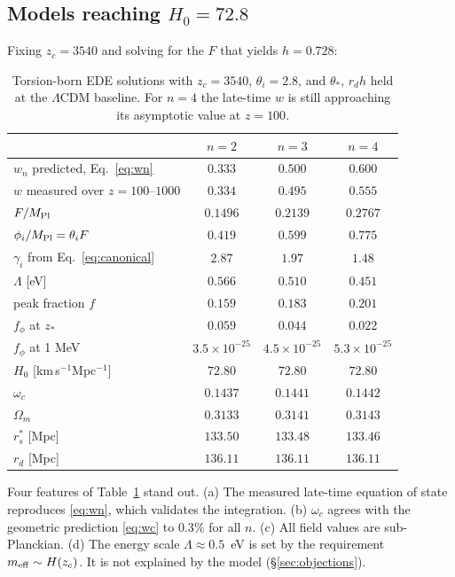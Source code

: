\documentclass[11pt]{article}
\newcommand{\Mp}{M_{\rm Pl}}
\begin{document}
\subsection{Models reaching $H_0=72.8$}
Fixing $z_c=3540$ and solving for the $F$ that yields $h=0.728$:
\begin{table}[h]
\centering
\begin{tabular}{lccc}
\toprule
& $n=2$ & $n=3$ & $n=4$\\
\midrule
$w_n$ predicted, Eq.~\eqref{eq:wn} & $0.333$ & $0.500$ & $0.600$\\
$w$ measured over $z=100$--$1000$ & $0.334$ & $0.495$ & $0.555$\\
\midrule
$F/\Mp$ & $0.1496$ & $0.2139$ & $0.2767$\\
$\phi_i/\Mp=\theta_iF$ & $0.419$ & $0.599$ & $0.775$\\
$\gamma_i$ from Eq.~\eqref{eq:canonical} & $2.87$ & $1.97$ & $1.48$\\
$\Lambda$ [eV] & $0.566$ & $0.510$ & $0.451$\\
\midrule
peak fraction $f$ & $0.159$ & $0.183$ & $0.201$\\
$f_\phi$ at $z_*$ & $0.059$ & $0.044$ & $0.022$\\
$f_\phi$ at 1 MeV & $3.5\times10^{-25}$ & $4.5\times10^{-25}$ & $5.3\times10^{-25}$\\
\midrule
$H_0$ [km\,s$^{-1}$Mpc$^{-1}$] & $72.80$ & $72.80$ & $72.80$\\
$\omega_c$ & $0.1437$ & $0.1441$ & $0.1442$\\
$\Omega_m$ & $0.3133$ & $0.3141$ & $0.3143$\\
$r_s^*$ [Mpc] & $133.50$ & $133.48$ & $133.46$\\
$r_d$ [Mpc] & $136.11$ & $136.11$ & $136.11$\\
\bottomrule
\end{tabular}
\caption{Torsion-born EDE solutions with $z_c=3540$, $\theta_i=2.8$, and $\theta_*$,
$r_dh$ held at the $\Lambda$CDM baseline. For $n=4$ the late-time $w$ is still approaching
its asymptotic value at $z=100$.}
\label{tab:main}
\end{table}

Four features of Table~\ref{tab:main} stand out. (a) The measured late-time equation of
state reproduces \eqref{eq:wn}, which validates the integration. (b) $\omega_c$ agrees
with the geometric prediction \eqref{eq:wc} to $0.3\%$ for all $n$. (c) All field values are
sub-Planckian. (d) The energy scale $\Lambda\approx0.5$~eV is set by the requirement
$m_{\rm eff}\sim H(z_c)$. It is not explained by the model (\S\ref{sec:objections}).
\end{document}
